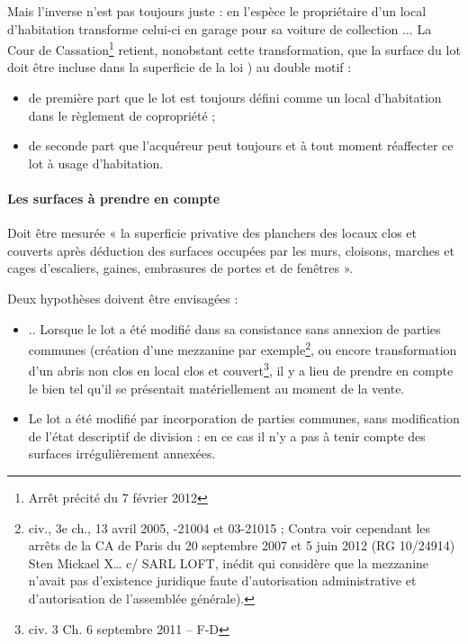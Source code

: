 			Mais l’inverse n’est pas toujours juste : en l’espèce le propriétaire d’un local d’habitation transforme celui-ci
			en garage pour sa voiture de collection $\dots$ La Cour de Cassation\footnote{Arrêt précité du 7 février 2012} retient, nonobstant cette
			transformation, que la surface du lot doit être incluse dans la superficie de la loi  ) au double motif
			:
			\begin{itemize}
				\item de première part que le lot est toujours défini comme un local d'habitation dans le règlement de
				copropriété ;
				\item de seconde part que l'acquéreur peut toujours et à tout moment réaffecter ce lot à usage
				d'habitation.
			\end{itemize}
			
			\paragraph{Les surfaces à prendre en compte}
			
			Doit être mesurée « la superficie privative des planchers des locaux clos et couverts après déduction des
			surfaces occupées par les murs, cloisons, marches et cages d'escaliers, gaines, embrasures de portes et de
			fenêtres ».
			
			Deux hypothèses doivent être envisagées :
			\begin{itemize}
				\item .. Lorsque le lot a été modifié dans sa consistance sans annexion de parties communes (création
				d’une mezzanine par exemple\footnote{
					civ., 3e ch., 13 avril 2005, -21004 et 03-21015 ; Contra voir cependant les arrêts de la CA de Paris du 20 septembre 2007 et 5
					juin 2012 (RG 10/24914) Sten Mickael X… c/ SARL LOFT, inédit qui considère que la mezzanine n’avait pas d’existence juridique faute
					d’autorisation administrative et d’autorisation de l’assemblée générale).
				}, ou encore transformation d’un abris non clos en local clos et couvert\footnote{civ. 3\ieme{} Ch. 6 septembre 2011 –  F-D}, il y a lieu de prendre en compte le bien tel qu'il se présentait matériellement au	moment de la vente.
				
				\item Le lot a été modifié par incorporation de parties communes, sans modification de l’état descriptif
				de division : en ce cas il n’y a pas à tenir compte des surfaces irrégulièrement annexées.
			\end{itemize}
			
